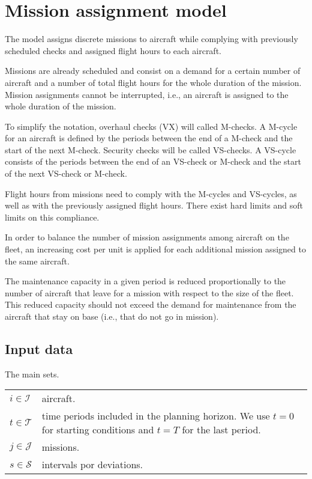 \chapter{Mission assignment model}

The model assigns discrete missions to aircraft while complying with previously scheduled checks and assigned flight hours to each aircraft.

Missions are already scheduled and consist on a demand for a certain number of aircraft and a number of total flight hours for the whole duration of the mission. Mission assignments cannot be interrupted, i.e., an aircraft is assigned to the whole duration of the mission.

To simplify the notation, overhaul checks (VX) will called M-checks. A M-cycle for an aircraft is defined by the periods between the end of a M-check and the start of the next M-check. Security checks will be called VS-checks. A VS-cycle consists of the periods between the end of an VS-check or M-check and the start of the next VS-check or M-check.

Flight hours from missions need to comply with the M-cycles and VS-cycles, as well as with the previously assigned flight hours. There exist hard limits and soft limits on this compliance.

In order to balance the number of mission assignments among aircraft on the fleet, an increasing cost per unit is applied for each additional mission assigned to the same aircraft.

The maintenance capacity in a given period is reduced proportionally to the number of aircraft that leave for a mission with respect to the size of the fleet. This reduced capacity should not exceed the demand for maintenance from the aircraft that stay on base (i.e., that do not go in mission).


\section{Input data}

The main sets.

  \begin{tabular}{p{15mm}p{120mm}}
    $i \in \mathcal{I}$     &  aircraft.    \\
    $t \in \mathcal{T}$     &  time periods included in the planning horizon. We use $t=0$ for starting conditions and $t=T$ for the last period. \\
    $j \in \mathcal{J}$     &  missions. \\
    $s \in \mathcal{S}$     &  intervals por deviations.
  \end{tabular}


